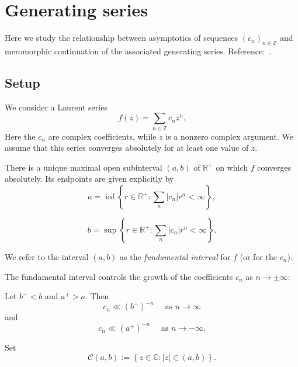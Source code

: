 \documentclass[reqno]{amsart}  \numberwithin{theorem}{section} \numberwithin{equation}{section}
\begin{document}
\section{Generating series}
Here we study the relationship between asymptotics of sequences $(c_n)_{n \in \mathbb{Z}}$ and meromorphic continuation of the associated generating series.  Reference:~\cite[\S5.2]{MR2172781}.


\subsection{Setup}
We consider a Laurent series
\begin{equation*}
  f (z) = \sum_{n \in \mathbb{Z} } c_n z^n.
\end{equation*}
Here the $c_n$ are complex coefficients, while $z$ is a nonzero complex argument.  We assume that this series converges absolutely for at least one value of $z$.

\begin{lemma}\label{lemma:cj3vqafpa6}
  There is a unique maximal open subinterval $(a,b)$ of $\mathbb{R}^+$ on which $f$ converges absolutely.  Its endpoints are given explicitly by
  \begin{equation*}
    a = \inf \left\{ r \in \mathbb{R}^+ : \sum_n \lvert c_n \rvert r^n < \infty  \right\},
  \end{equation*}

\begin{equation*}
  b = \sup \left\{ r \in \mathbb{R}^+ : \sum_n \lvert c_n \rvert r^n < \infty  \right\}.
\end{equation*}
\end{lemma}
We refer to the interval $(a,b)$ as the \emph{fundamental interval} for $f$ (or for the $c_n$).

The fundamental interval controls the growth of the coefficients $c_n$ as $n \rightarrow \pm \infty$:
\begin{lemma}
  Let $b^- < b$ and $a^+ > a$.  Then
  \begin{equation*}
    c_n \ll {(b^-)}^{-n} \quad \text{ as } n \rightarrow \infty
  \end{equation*}
  and
  \begin{equation*}
    c_n \ll {(a^+)}^{-n} \quad \text{ as } n \rightarrow -\infty.
  \end{equation*}
\end{lemma}

Set
\begin{equation*}
  \mathcal{C} (a, b) := \left\{ z \in \mathbb{C} : \lvert z  \rvert \in (a,b) \right\}.
\end{equation*}
\end{document}
